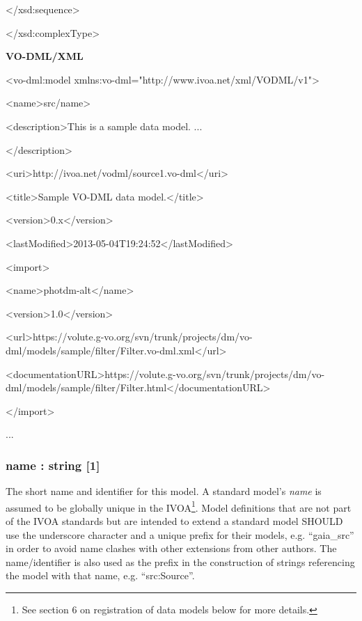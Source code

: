 \documentclass[10pt,a4paper]{ivoa}
\begin{document}
\textless/xsd:sequence\textgreater{}

\textless/xsd:complexType\textgreater{}

\textbf{VO-DML/XML}

\textless vo-dml:model
xmlns:vo-dml="http://www.ivoa.net/xml/VODML/v1"\textgreater{}

\textless name\textgreater src/name\textgreater{}

\textless description\textgreater This is a sample data model. ...

\textless/description\textgreater{}

\textless uri\textgreater http://ivoa.net/vodml/source1.vo-dml\textless/uri\textgreater{}

\textless title\textgreater Sample VO-DML data
model.\textless/title\textgreater{}

\textless version\textgreater0.x\textless/version\textgreater{}

\textless lastModified\textgreater2013-05-04T19:24:52\textless/lastModified\textgreater{}

\textless import\textgreater{}

\textless name\textgreater photdm-alt\textless/name\textgreater{}

\textless version\textgreater1.0\textless/version\textgreater{}

\textless url\textgreater https://volute.g-vo.org/svn/trunk/projects/dm/vo-dml/models/sample/filter/Filter.vo-dml.xml\textless/url\textgreater{}

\textless documentationURL\textgreater https://volute.g-vo.org/svn/trunk/projects/dm/vo-dml/models/sample/filter/Filter.html\textless/documentationURL\textgreater{}

\textless/import\textgreater{}

...

\hypertarget{name-string-1}{%
\subsubsection{name : string {[}1{]}}\label{name-string-1}}

The short name and identifier for this model. A standard model's
\emph{name} is assumed to be globally unique in the IVOA\footnote{See
  section 6 on registration of data models below for more details.}.
Model definitions that are not part of the IVOA standards but are
intended to extend a standard model SHOULD use the underscore character
and a unique prefix for their models, e.g. ``gaia\_src'' in order to
avoid name clashes with other extensions from other authors. The
name/identifier is also used as the prefix in the construction of
strings referencing the model with that name, e.g. ``src:Source''.
\end{document}
